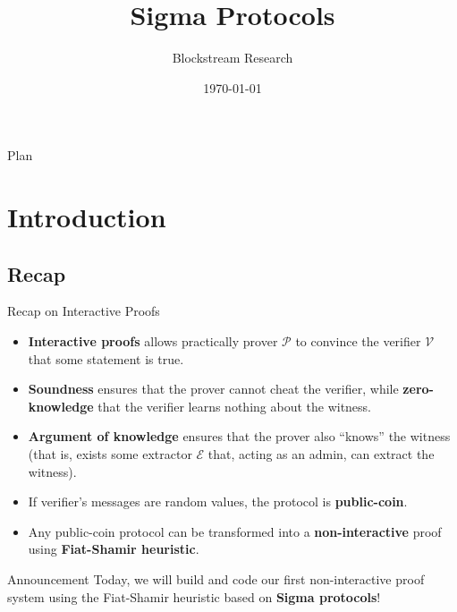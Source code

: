 \documentclass{zkdl-presentation-template}
\title[Sigma Protocols]{\textbf{Sigma Protocols}}
\author{Blockstream Research}
\date{\today}
\begin{document}
    \maketitleframe

    \begin{frame}{Plan}
        \tableofcontents[hideallsubsections]
    \end{frame}

    \section{Introduction}

    \subsection{Recap}
    \begin{frame}{Recap on Interactive Proofs}
        \begin{itemize}\small
            \item \textbf{Interactive proofs} allows practically prover $\mathcal{P}$ to convince the verifier $\mathcal{V}$ that some statement is true.\pause
            \item \textbf{Soundness} ensures that the prover cannot cheat the verifier, while \textbf{zero-knowledge} that the verifier learns nothing about the witness.\pause
            \item \textbf{Argument of knowledge} ensures that the prover also ``knows'' the witness (that is, exists some extractor $\mathcal{E}$ that, acting as an admin, can extract the witness).\pause
            \item If verifier's messages are random values, the protocol is \textbf{public-coin}.\pause
            \item Any public-coin protocol can be transformed into a \textbf{non-interactive} proof using \textbf{Fiat-Shamir heuristic}.\pause
        \end{itemize}

        \begin{alertblock}{Announcement}
            Today, we will build and code our first non-interactive proof system using the Fiat-Shamir heuristic based on \textbf{Sigma protocols}!
        \end{alertblock}
    \end{frame}
\end{document}
